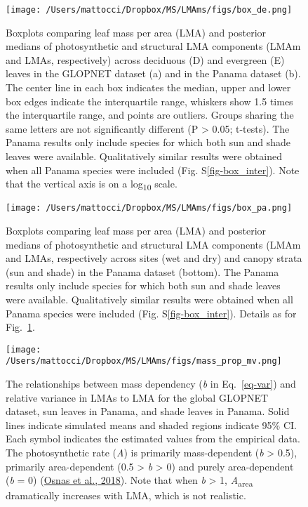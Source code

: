 \documentclass[
  12pt,
  a4paper,
,tablecaptionabove
]{scrartcl}
\begin{document}
\begin{figure}

{\centering \texttt{[image: /Users/mattocci/Dropbox/MS/LMAms/figs/box\_de.png]}

}

\caption{\label{fig-boxplt_de}Boxplots comparing leaf mass per area
(LMA) and posterior medians of photosynthetic and structural LMA
components (LMAm and LMAs, respectively) across deciduous (D) and
evergreen (E) leaves in the GLOPNET dataset (a) and in the Panama
dataset (b). The center line in each box indicates the median, upper and
lower box edges indicate the interquartile range, whiskers show 1.5
times the interquartile range, and points are outliers. Groups sharing
the same letters are not significantly different (P \textgreater{} 0.05;
t-tests). The Panama results only include species for which both sun and
shade leaves were available. Qualitatively similar results were obtained
when all Panama species were included (Fig. S\ref{fig-box_inter}). Note
that the vertical axis is on a log\textsubscript{10} scale.}

\end{figure}

\newpage

\begin{figure}

{\centering \texttt{[image: /Users/mattocci/Dropbox/MS/LMAms/figs/box\_pa.png]}

}

\caption{\label{fig-boxplt_pa}Boxplots comparing leaf mass per area
(LMA) and posterior medians of photosynthetic and structural LMA
components (LMAm and LMAs, respectively across sites (wet and dry) and
canopy strata (sun and shade) in the Panama dataset (bottom). The Panama
results only include species for which both sun and shade leaves were
available. Qualitatively similar results were obtained when all Panama
species were included (Fig. S\ref{fig-box_inter}). Details as for
Fig.~\ref{fig-boxplt_de}.}

\end{figure}

\newpage

\begin{figure}

{\centering \texttt{[image: /Users/mattocci/Dropbox/MS/LMAms/figs/mass\_prop\_mv.png]}

}

\caption{\label{fig-massplt}The relationships between mass dependency
(\emph{b} in Eq.~\ref{eq-var}) and relative variance in LMAs to LMA for
the global GLOPNET dataset, sun leaves in Panama, and shade leaves in
Panama. Solid lines indicate simulated means and shaded regions indicate
95\% CI. Each symbol indicates the estimated values from the empirical
data. The photosynthetic rate (\emph{A}) is primarily mass-dependent
(\emph{b} \textgreater{} 0.5), primarily area-dependent (0.5
\textgreater{} \emph{b} \textgreater{} 0) and purely area-dependent
(\emph{b} = 0) (\protect\hyperlink{ref-Osnas2018}{Osnas et al., 2018}).
Note that when \emph{b} \textgreater{} 1, \emph{A}\textsubscript{area}
dramatically increases with LMA, which is not realistic.}

\end{figure}
\end{document}
